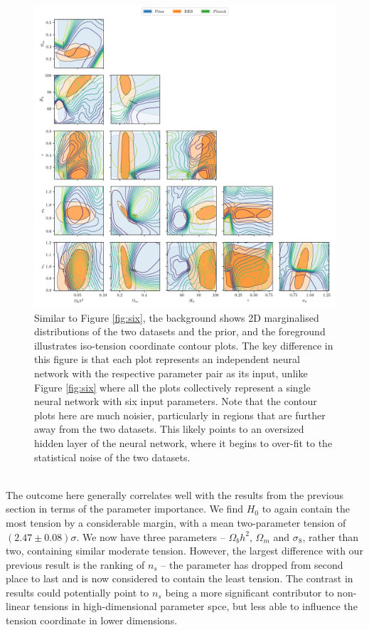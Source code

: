 \documentclass[%
 reprint,
 amsmath,amssymb,
 aps,
]{revtex4-2}
\begin{document}
\begin{figure}
    \includegraphics[width=\textwidth]{../plots/pairs.png}
    \centering
    \caption{Similar to Figure \ref{fig:six}, the background shows 2D marginalised distributions of the two datasets and the prior, and the foreground illustrates iso-tension coordinate contour plots. The key difference in this figure is that each plot represents an independent neural network with the respective parameter pair as its input, unlike Figure \ref{fig:six} where all the plots collectively represent a single neural network with six input parameters. Note that the contour plots here are much noisier, particularly in regions that are further away from the two datasets. This likely points to an oversized hidden layer of the neural network, where it begins to over-fit to the statistical noise of the two datasets. \\ \\}
    \label{fig:pairs}
\end{figure}

The outcome here generally correlates well with the results from the previous section in terms of the parameter importance. We find $H_0$ to again contain the most tension by a considerable margin, with a mean two-parameter tension of $(2.47 \pm 0.08)\sigma$. We now have three parameters -- $\Omega_b h^2$, $\Omega_m$ and $\sigma_8$, rather than two, containing similar moderate tension. However, the largest difference with our previous result is the ranking of $n_s$ -- the parameter has dropped from second place to last and is now considered to contain the least tension. The contrast in results could potentially point to $n_s$ being a more significant contributor to non-linear tensions in high-dimensional parameter spce, but less able to influence the tension coordinate in lower dimensions.
\end{document}
